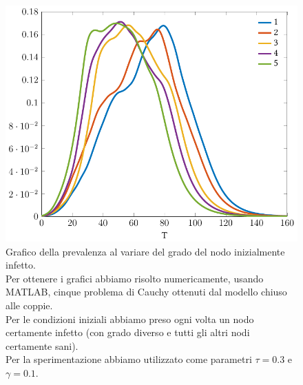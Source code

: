 \begin{figure}[htb]
\centering
%
\includegraphics{Figure/minnesota_prevalenza}
\caption[Grafico della prevalenza al variare del grado del nodo inizialmente infetto.]{Grafico della prevalenza al variare del grado del nodo inizialmente infetto.\\ Per ottenere i grafici abbiamo risolto numericamente, usando MATLAB, cinque problema di Cauchy ottenuti dal modello chiuso alle coppie.\\
Per le condizioni iniziali abbiamo preso ogni volta un nodo certamente infetto (con grado diverso e tutti gli altri nodi certamente sani).\\
Per la sperimentazione abbiamo utilizzato come parametri $\tau=0.3$ e $\gamma=0.1$.}
\label{fig::minnesota_prevalenza}
\end{figure}
